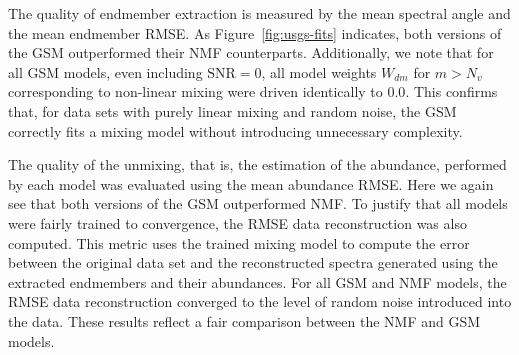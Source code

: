 \documentclass[remotesensing,article,submit,pdftex,moreauthors]{Definitions/mdpi}
\begin{document}
The quality of endmember extraction is measured by the mean spectral angle and the mean endmember RMSE. As Figure~\ref{fig:usgs-fits} indicates, both versions of the GSM outperformed their NMF counterparts. Additionally, we note that for all GSM models, even including $\text{SNR}=0$, all model weights $W_{dm}$ for $m>N_v$ corresponding to non-linear mixing were driven identically to $0.0$. This confirms that, for data sets with purely linear mixing and random noise, the GSM correctly fits a mixing model without introducing unnecessary complexity.

The quality of the unmixing, that is, the estimation of the abundance, performed by each model was evaluated using the mean abundance RMSE. Here we again see that both versions of the GSM outperformed NMF. To justify that all models were fairly trained to convergence, the RMSE data reconstruction was also computed. This metric uses the trained mixing model to compute the error between the original data set and the reconstructed spectra generated using the extracted endmembers and their abundances. For all GSM and NMF models, the RMSE data reconstruction converged to the level of random noise introduced into the data. These results reflect a fair comparison between the NMF and GSM models.
\end{document}
